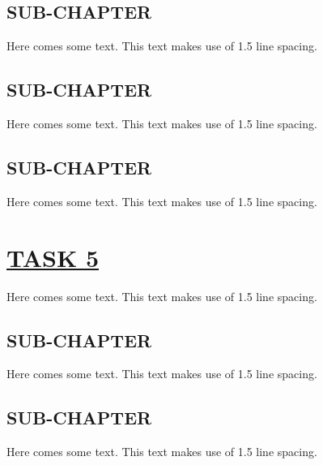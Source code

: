 \documentclass[fontsize=11pt]{scrartcl}
\begin{document}
\subsection{SUB-CHAPTER}
Here comes some text. This text makes use of 1.5 line spacing. 
\subsection{SUB-CHAPTER}
Here comes some text. This text makes use of 1.5 line spacing. 
\subsection{SUB-CHAPTER}
Here comes some text. This text makes use of 1.5 line spacing. 
\pagebreak
\section{\uline{TASK 5}}
Here comes some text. This text makes use of 1.5 line spacing. 
\subsection{SUB-CHAPTER}
Here comes some text. This text makes use of 1.5 line spacing. 
\subsection{SUB-CHAPTER}
Here comes some text. This text makes use of 1.5 line spacing. 
\end{document}
